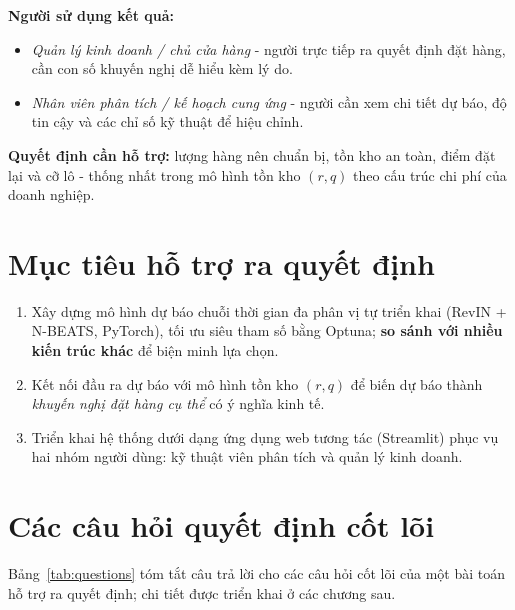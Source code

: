 \documentclass[12pt, a4paper]{report}
\begin{document}
\textbf{Người sử dụng kết quả:}
\begin{itemize}[nosep]
  \item \textit{Quản lý kinh doanh / chủ cửa hàng} - người trực tiếp ra quyết định đặt hàng, cần con số khuyến nghị dễ hiểu kèm lý do.
  \item \textit{Nhân viên phân tích / kế hoạch cung ứng} - người cần xem chi tiết dự báo, độ tin cậy và các chỉ số kỹ thuật để hiệu chỉnh.
\end{itemize}

\textbf{Quyết định cần hỗ trợ:} lượng hàng nên chuẩn bị, tồn kho an toàn, điểm đặt lại và cỡ lô - thống nhất trong mô hình tồn kho $(r,q)$ theo cấu trúc chi phí của doanh nghiệp.

\section{Mục tiêu hỗ trợ ra quyết định}

\begin{enumerate}
  \item Xây dựng mô hình dự báo chuỗi thời gian đa phân vị tự triển khai (RevIN + N-BEATS, PyTorch), tối ưu siêu tham số bằng Optuna; \textbf{so sánh với nhiều kiến trúc khác} để biện minh lựa chọn.
  \item Kết nối đầu ra dự báo với mô hình tồn kho $(r,q)$ để biến dự báo thành \textit{khuyến nghị đặt hàng cụ thể} có ý nghĩa kinh tế.
  \item Triển khai hệ thống dưới dạng ứng dụng web tương tác (Streamlit) phục vụ hai nhóm người dùng: kỹ thuật viên phân tích và quản lý kinh doanh.
\end{enumerate}

\section{Các câu hỏi quyết định cốt lõi}

Bảng~\ref{tab:questions} tóm tắt câu trả lời cho các câu hỏi cốt lõi của một bài toán hỗ trợ ra quyết định; chi tiết được triển khai ở các chương sau.
\end{document}
